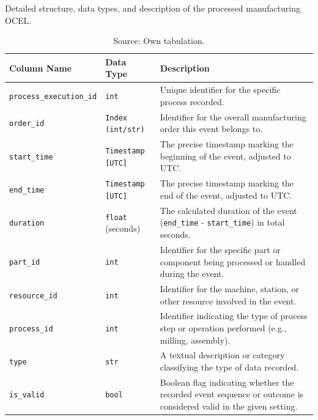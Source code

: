 \begin{table}[htbp]
  \centering
  \caption[Manufacturing OCEL used]{Detailed structure, data types, and description of the processed manufacturing OCEL.}
  \label{tab:output-structure-detailed}
  \begin{tabular}{l l p{6cm}} %
    \toprule
    \textbf{Column Name}            & \textbf{Data Type}       & \textbf{Description}                                                                                             \\
    \midrule
    \texttt{process\_execution\_id} & \texttt{int}             & Unique identifier for the specific process recorded.                                                             \\
    \texttt{order\_id}              & \texttt{Index (int/str)} & Identifier for the overall manufacturing order this event belongs to.                                            \\
    \texttt{start\_time}            & \texttt{Timestamp [UTC]} & The precise timestamp marking the beginning of the event, adjusted to UTC.                                       \\
    \texttt{end\_time}              & \texttt{Timestamp [UTC]} & The precise timestamp marking the end of the event, adjusted to UTC.                                             \\
    \texttt{duration}               & \texttt{float} (seconds) & The calculated duration of the event (\texttt{end\_time} - \texttt{start\_time}) in total seconds.               \\
    \texttt{part\_id}               & \texttt{int}             & Identifier for the specific part or component being processed or handled during the event.                       \\
    \texttt{resource\_id}           & \texttt{int}             & Identifier for the machine, station, or other resource involved in the event.                                    \\
    \texttt{process\_id}            & \texttt{int}             & Identifier indicating the type of process step or operation performed (e.g., milling, assembly).                 \\
    \texttt{type}                   & \texttt{str}             & A textual description or category classifying the type of data recorded.                                         \\
    \texttt{is\_valid}              & \texttt{bool}            & Boolean flag indicating whether the recorded event sequence or outcome is considered valid in the given setting. \\
    \bottomrule
  \end{tabular}
  \caption*{Source: Own tabulation.}
\end{table}


